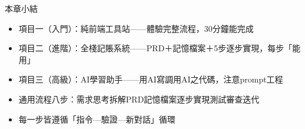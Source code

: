 \begin{tcbsummary}{本章小結}
\begin{itemize}
  \item 項目一（入門）：純前端工具站——體驗完整流程，30分鐘能完成
  \item 項目二（進階）：全棧記賬系統——PRD＋記憶檔案＋5步逐步實現，每步「能用」
  \item 項目三（高級）：AI學習助手——用AI寫調用AI之代碼，注意prompt工程
  \item 通用流程八步：需求思考拆解PRD記憶檔案逐步實現測試審查迭代
  \item 每一步皆遵循「指令—驗證—新對話」循環
\end{itemize}

\end{tcbsummary}

